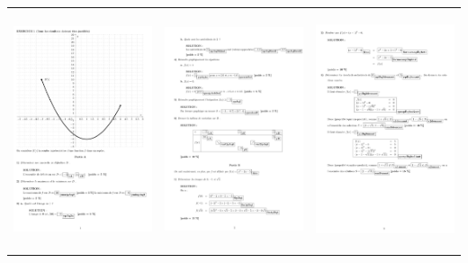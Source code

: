 { \begin{center}
 \begin{tabular}{ccc}
 \includegraphics[width=5cm,height=7cm]{./images/creation_exercice_var_04a.png}
&
 \includegraphics[width=5cm,height=7cm]{./images/creation_exercice_var_04b.png}
 &
 \includegraphics[width=5cm,height=7cm]{./images/creation_exercice_var_04c.png}
\end{tabular}
\end{center}

}
